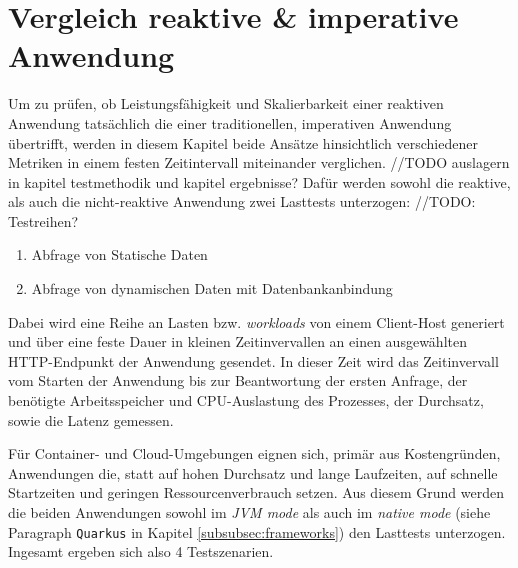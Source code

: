 \section {Vergleich reaktive \& imperative Anwendung}
\label{section:vergleich_reaktiv_imperativ}
Um zu prüfen, ob Leistungsfähigkeit und Skalierbarkeit einer reaktiven Anwendung tatsächlich die einer traditionellen, imperativen Anwendung
übertrifft, werden in diesem Kapitel beide Ansätze hinsichtlich verschiedener Metriken in einem festen Zeitintervall miteinander verglichen.
//TODO auslagern in kapitel testmethodik und kapitel ergebnisse?
Dafür werden sowohl die reaktive, als auch die nicht-reaktive Anwendung zwei Lasttests unterzogen: //TODO: Testreihen?
\begin{enumerate}
	\item Abfrage von Statische Daten
	\item Abfrage von dynamischen Daten mit Datenbankanbindung
\end{enumerate}
Dabei wird eine Reihe an Lasten bzw. \textit{workloads} von einem Client-Host generiert und über eine feste Dauer in kleinen Zeitinvervallen
an einen ausgewählten HTTP-Endpunkt der Anwendung gesendet.
In dieser Zeit wird das Zeitinvervall vom Starten der Anwendung bis zur Beantwortung der ersten Anfrage,
der benötigte Arbeitsspeicher und CPU-Auslastung des Prozesses, der Durchsatz, sowie die Latenz gemessen.

Für Container- und Cloud-Umgebungen eignen sich, primär aus Kostengründen, Anwendungen die, statt auf hohen Durchsatz und lange Laufzeiten, auf
schnelle Startzeiten und geringen Ressourcenverbrauch setzen.
Aus diesem Grund werden die beiden Anwendungen sowohl im \textit{JVM mode} als auch im \textit{native mode}
(siehe Paragraph \verb|Quarkus| in Kapitel \ref{subsubsec:frameworks})
den Lasttests unterzogen. Ingesamt ergeben sich also 4 Testszenarien.


